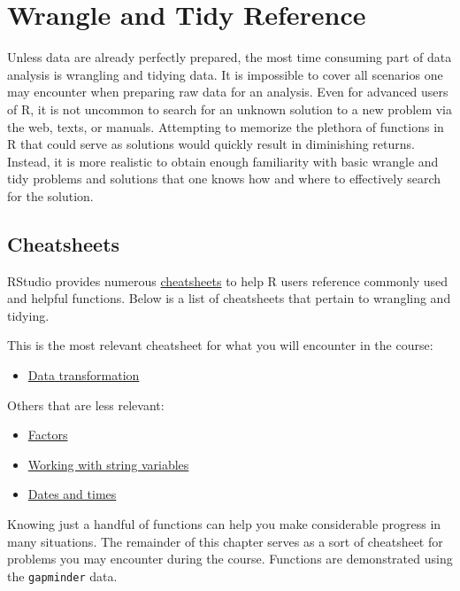 \documentclass[
]{book}
\providecommand{\tightlist}{%
  \setlength{\itemsep}{0pt}\setlength{\parskip}{0pt}}
\begin{document}
\hypertarget{appendixB}{%
\chapter{Wrangle and Tidy Reference}\label{appendixB}}

Unless data are already perfectly prepared, the most time consuming part of data analysis is wrangling and tidying data. It is impossible to cover all scenarios one may encounter when preparing raw data for an analysis. Even for advanced users of R, it is not uncommon to search for an unknown solution to a new problem via the web, texts, or manuals. Attempting to memorize the plethora of functions in R that could serve as solutions would quickly result in diminishing returns. Instead, it is more realistic to obtain enough familiarity with basic wrangle and tidy problems and solutions that one knows how and where to effectively search for the solution.

\hypertarget{cheatsheets}{%
\section{Cheatsheets}\label{cheatsheets}}

RStudio provides numerous \href{https://rstudio.com/resources/cheatsheets/}{cheatsheets} to help R users reference commonly used and helpful functions. Below is a list of cheatsheets that pertain to wrangling and tidying.

This is the most relevant cheatsheet for what you will encounter in the course:

\begin{itemize}
\tightlist
\item
  \href{https://github.com/rstudio/cheatsheets/raw/master/data-transformation.pdf}{Data transformation}
\end{itemize}

Others that are less relevant:

\begin{itemize}
\tightlist
\item
  \href{https://github.com/rstudio/cheatsheets/raw/master/factors.pdf}{Factors}
\item
  \href{https://github.com/rstudio/cheatsheets/raw/master/strings.pdf}{Working with string variables}
\item
  \href{https://github.com/rstudio/cheatsheets/raw/master/lubridate.pdf}{Dates and times}
\end{itemize}

Knowing just a handful of functions can help you make considerable progress in many situations. The remainder of this chapter serves as a sort of cheatsheet for problems you may encounter during the course. Functions are demonstrated using the \texttt{gapminder} data.
\end{document}
